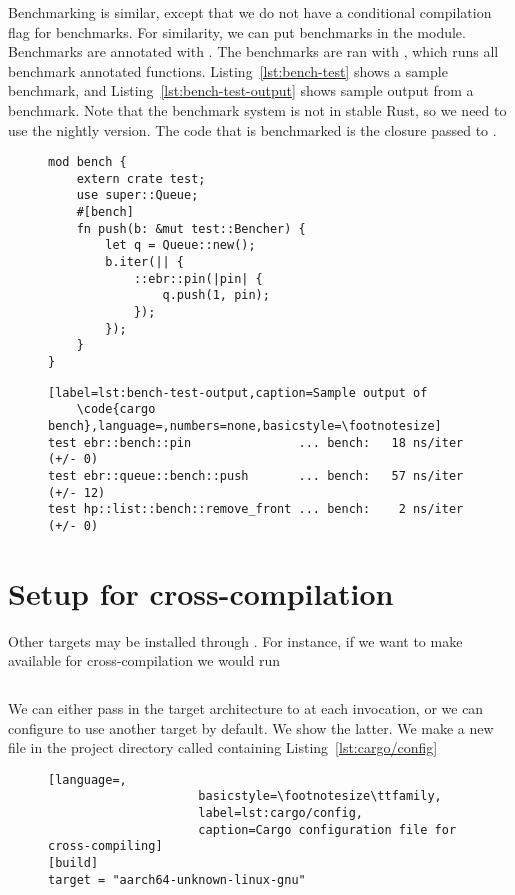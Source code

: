 \documentclass[a4paper,twoside]{report}
\begin{document}
\begin{appendices}
  Benchmarking is similar, except that we do not have a conditional compilation
  flag for benchmarks. For similarity, we can put benchmarks in the 
  module. Benchmarks are annotated with \code{\#[bench]}. The benchmarks are ran
  with , which runs all benchmark annotated functions.
  Listing~\ref{lst:bench-test} shows a sample benchmark, and
  Listing~\ref{lst:bench-test-output} shows sample output from a benchmark.
  Note that the benchmark system is not in stable Rust, so we need to use the
  nightly version. The code that is benchmarked is the closure passed to
  .
  \begin{figure}[ht!]
  \begin{lstlisting}[label=lst:bench-test,caption=An example benchmark in Rust]
mod bench {
    extern crate test;
    use super::Queue;
    #[bench]
    fn push(b: &mut test::Bencher) {
        let q = Queue::new();
        b.iter(|| {
            ::ebr::pin(|pin| {
                q.push(1, pin);
            });
        });
    }
}
    \end{lstlisting}
  \end{figure}
  \begin{figure}[ht!]
    \begin{lstlisting}[label=lst:bench-test-output,caption=Sample output of
    \code{cargo bench},language=,numbers=none,basicstyle=\footnotesize]
test ebr::bench::pin               ... bench:   18 ns/iter (+/- 0)
test ebr::queue::bench::push       ... bench:   57 ns/iter (+/- 12)
test hp::list::bench::remove_front ... bench:    2 ns/iter (+/- 0)
    \end{lstlisting}
  \end{figure}





  \section{Setup for cross-compilation}
  Other targets may be installed through \rustup{}. For instance, if we want to
  make  available for cross-compilation we would run
  \begin{lstlisting}[language=Bash,numbers=none]
% rustup target add aarch64-unknown-linux-gnu
  \end{lstlisting}
  We can either pass in the target architecture to \cargo{} at each invocation,
  or we can configure \cargo{} to use another target by default. We show the latter.
  We make a new file in the project directory called 
  containing Listing~\ref{lst:cargo/config}
  \begin{figure}[ht]
  \begin{lstlisting}[language=,
                     basicstyle=\footnotesize\ttfamily,
                     label=lst:cargo/config,
                     caption=Cargo configuration file for cross-compiling]
[build]
target = "aarch64-unknown-linux-gnu"


\end{lstlisting}
\end{figure}
\end{appendices}
\end{document}
